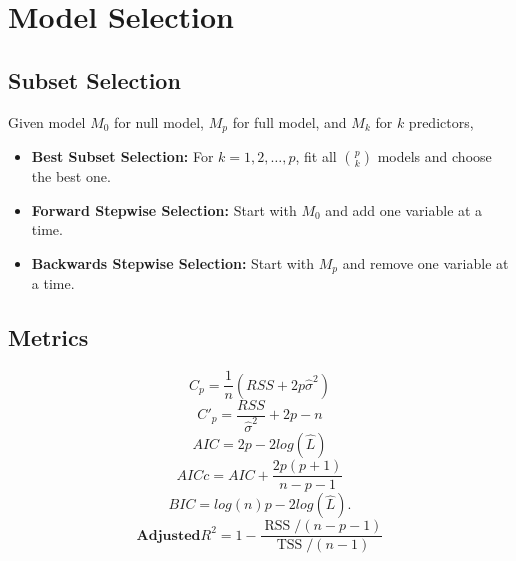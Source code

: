 \documentclass[a4paper,9pt,fleqn]{extarticle}
\DeclareMathOperator{\TSS}{TSS}
\DeclareMathOperator{\RSS}{RSS}
\begin{document}
\section{Model Selection}
\begin{minipage}[t]{0.45\textwidth}
    \subsection*{Subset Selection}
    Given model \(M_0\) for null model, \(M_p\) for full model, and \(M_k\) for \(k\) predictors,
    \begin{itemize}
        \item \textbf{Best Subset Selection:} For \(k = 1, 2, \dots, p\), fit all \(\binom{p}{k}\) models and choose the best one. 
        \item \textbf{Forward Stepwise Selection:} Start with \(M_0\) and add one variable at a time.
        \item \textbf{Backwards Stepwise Selection:} Start with \(M_p\) and remove one variable at a time.  
    \end{itemize}
\end{minipage}
\hspace{0.05\textwidth}
\begin{minipage}[t]{0.45\textwidth}
    \subsection*{Metrics}
    \[
        C_p = \frac{1}{n}(RSS + 2p\hat{\sigma}^2) 
    \]
    \[
        C'_p = \frac{RSS}{\hat{\sigma}^2} + 2p - n
    \]
    \[
        AIC = 2p - 2log(\hat{L})  
    \]
    \[
        AICc = AIC + \frac{2p(p + 1)}{n - p - 1}
    \]
    \[
        BIC = log(n)p - 2log(\hat{L}).
    \]
    \[
        \textbf{Adjusted} R^2 = 1 - \frac{\RSS/(n - p - 1)}{\TSS/(n - 1)}
    \]
\end{minipage}
\end{document}
